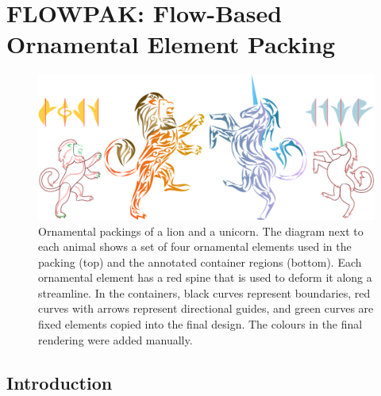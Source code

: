 \chapter
{FLOWPAK: Flow-Based Ornamental Element Packing}
\label{chapter_flowpak}



\begin{figure}[h!]
\centering
\includegraphics[width=1.0\textwidth]{figures/flowpak/lion_unicorn.pdf} 
\caption[A packing of lion and unicorn]
{\label{fig_lion_unicorn} 
Ornamental packings of a lion and a unicorn.
The diagram next to each animal shows a set of four ornamental
elements used in the packing (top) and the annotated
container regions (bottom).  Each ornamental element has a
red spine that is used to deform it along a streamline.  In
the containers, black curves represent boundaries, red
curves with arrows represent directional guides, and green
curves are fixed elements copied into the final design.
The colours in the final rendering were added manually. }
\end{figure}




\section{Introduction}
\label{flowpak_introduction}





